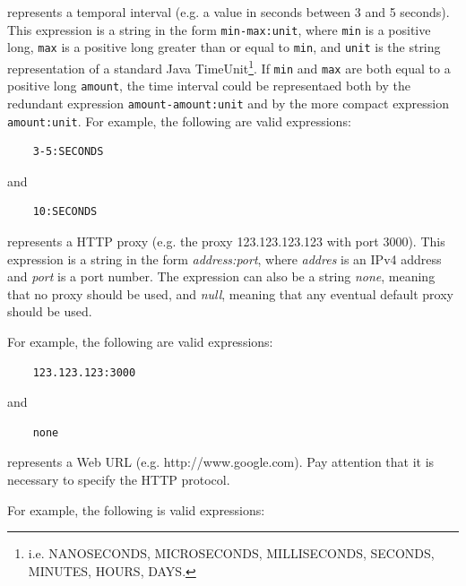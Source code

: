 \begin{description}
  \setlength\itemsep{1em}

  \item[time-expression] represents a temporal interval (e.g. a value in seconds between 3 and 5 seconds). This expression is a string in the form \texttt{min-max:unit}, where \texttt{min} is a positive long, \texttt{max} is a positive long greater than or equal to \texttt{min}, and \texttt{unit} is the string representation of a standard Java TimeUnit\footnote{i.e. NANOSECONDS, MICROSECONDS, MILLISECONDS, SECONDS, MINUTES, HOURS, DAYS.}. If \texttt{min} and \texttt{max} are both equal to a positive long \texttt{amount}, the time interval could be representaed both by the redundant expression \texttt{amount-amount:unit} and by the more compact expression \texttt{amount:unit}.
  For example, the following are valid expressions:

  \begin{verbatim}
    3-5:SECONDS
  \end{verbatim}

  and

  \begin{verbatim}
    10:SECONDS
  \end{verbatim}

  \item[proxy-expression] represents a HTTP proxy (e.g. the proxy 123.123.123.123 with port 3000). This expression is a string in the form \textit{address:port}, where \textit{addres} is an IPv4 address and \textit{port} is a port number. The expression can also be a string \textit{none}, meaning that no proxy should be used, and \textit{null}, meaning that any eventual default proxy should be used.

  For example, the following are valid expressions:

  \begin{verbatim}
    123.123.123:3000
  \end{verbatim}

  and

  \begin{verbatim}
    none
  \end{verbatim}

  \item[web-expression] represents a Web URL (e.g. http://www.google.com). Pay attention that it is necessary to specify the HTTP protocol.

  For example, the following is valid expressions:


\end{description}
